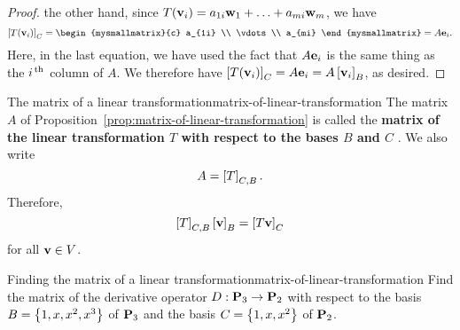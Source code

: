 \begin{proof}
  the other hand, since
  $T(\mbox{\bf v}_i) = a_{1i}\mbox{\bf w}_1 + \ldots + a_{mi}\mbox{\bf w}_m$,
  we have
  \begin{equation*}
    \coord{T(\vect{v}_i)}_C =
    \begin{mysmallmatrix}{c}
      a_{1i} \\ \vdots \\ a_{mi}
    \end{mysmallmatrix}
    = A\vect{e}_i.
  \end{equation*}
  Here, in the last equation, we have used the fact that $A\mbox{\bf e}_i$
  is the same thing as the $i^{\,\rm th}$ column of $A$. We therefore have
  $\left[T(\mbox{\bf v}_i)\right]_C = A\mbox{\bf e}_i = A \left[\mbox{\bf v}_i\right]_B$, as
  desired.
\end{proof}

\begin{definition}{The matrix of a linear transformation}{matrix-of-linear-transformation}
  The matrix $A$ of
  Proposition~\ref{prop:matrix-of-linear-transformation} is called the
  \textbf{matrix of the linear transformation\/ $T$ with respect to
    the bases $B$ and $C$}%
  .  We also
  write
  \begin{equation*}
    A = \left[T\right]_{C,B}.
  \end{equation*}
  Therefore,
  \begin{equation*}
    \left[T\right]_{C,B}\left[\mbox{\bf v}\right]_B = \left[T\mbox{\bf v}\right]_C
  \end{equation*}
  for all $\mbox{\bf v}\in V$.
\end{definition}

\begin{example}{Finding the matrix of a linear transformation}{matrix-of-linear-transformation}
  Find the matrix of the derivative operator $D:\mathbf{P}_3\to\mathbf{P}_2$
  with respect to the basis $B=\left\{1,x,x^2,x^3\right\}$ of $\mathbf{P}_3$ and the
  basis $C=\left\{1,x,x^2\right\}$ of $\mathbf{P}_2$.
\end{example}

